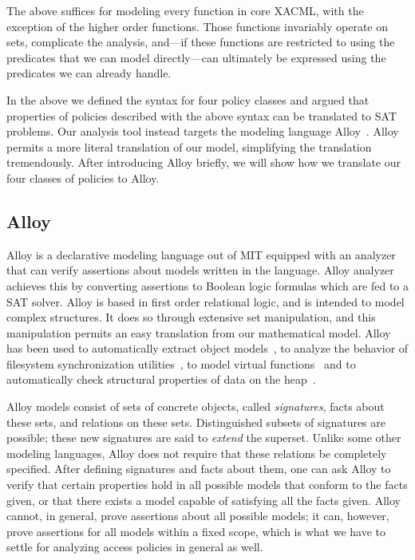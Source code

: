 The above suffices for modeling every function in core XACML, with the
exception of the higher order functions.  Those functions invariably
operate on sets, complicate the analysis, and---if these functions are
restricted to using the predicates that we can model directly---can
ultimately be expressed using the predicates we can already handle.

In the above we defined the syntax for four policy classes and argued
that properties of policies described with the above syntax can be
translated to SAT problems.  Our analysis tool instead targets the
modeling language
Alloy~\cite{jackson:alcoa,jackson:micromodels,jackson00automating}.
Alloy permits a more literal translation of our model, simplifying the
translation tremendously. After introducing Alloy briefly, we will
show how we translate our four classes of policies to Alloy.

\subsection{Alloy}

Alloy is a declarative modeling language out of MIT equipped with an
analyzer that can verify assertions about models written in the
language.  Alloy analyzer achieves this by converting assertions to
Boolean logic formulas which are fed to a SAT solver.  Alloy is based
in first order relational logic, and is intended to model complex
structures. It does so through extensive set manipulation, and this
manipulation permits an easy translation from our mathematical model.
Alloy has been used to automatically extract object
models~\cite{jackson01lightweight,waingold01automated}, to analyze the
behavior of filesystem synchronization
utilities~\cite{nolte02filesystem}, to model virtual
functions~\cite{marinov02valloy} and to automatically check structural
properties of data on the heap~\cite{vaziri03heap}.

Alloy models consist of sets of concrete objects, called
\emph{signatures}, facts about these sets, and relations on these
sets.  Distinguished subsets of signatures are possible; these new
signatures are said to \emph{extend} the superset.  Unlike some other
modeling languages, Alloy does not require that these relations be
completely specified.  After defining signatures and facts about them,
one can ask Alloy to verify that certain properties hold in all
possible models that conform to the facts given, or that there exists
a model capable of satisfying all the facts given.  Alloy cannot, in
general, prove assertions about all possible models; it can, however,
prove assertions for all models within a fixed scope, which is what we
have to settle for analyzing access policies in general as well.

